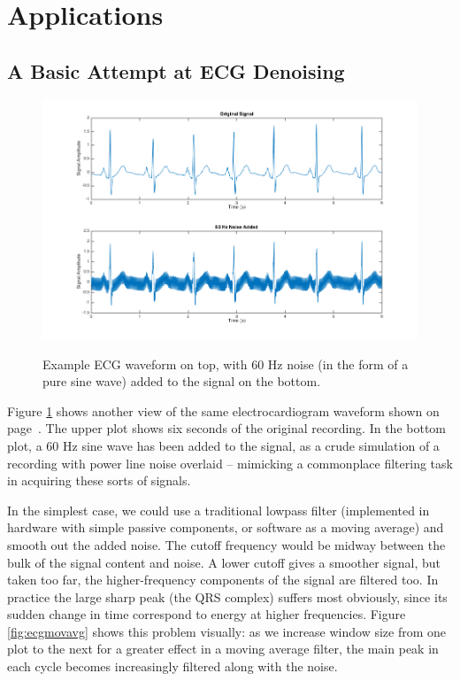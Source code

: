 \documentclass[letterpaper]{article}
\begin{document}
\section{Applications}

\subsection{A Basic Attempt at ECG Denoising}

\begin{figure}[h]
  \caption{Example ECG waveform on top, with 60 Hz noise (in the form of a pure sine wave) added to the signal on the bottom.}
  \centering
    \includegraphics[width=1\textwidth]{figures/ecgplots}
  \label{fig:ecgplots}
\end{figure}

Figure \ref{fig:ecgplots} shows another view of the same electrocardiogram waveform shown on page~\pageref{fig:ecgboth}.
The upper plot shows six seconds of the original recording.
In the bottom plot, a 60 Hz sine wave has been added to the signal,
as a crude simulation of a recording with power line noise overlaid --
mimicking a commonplace filtering task in acquiring these sorts of signals.

In the simplest case, we could use a traditional lowpass filter 
(implemented in hardware with simple passive components, or software as a moving average)
and smooth out the added noise.
The cutoff frequency would be midway between the bulk of the signal content and noise.
A lower cutoff gives a smoother signal, but taken too far, the higher-frequency components of the signal are filtered too.
In practice the large sharp peak (the QRS complex) suffers most obviously, since its sudden change in time correspond to
energy at higher frequencies.
Figure \ref{fig:ecgmovavg} shows this problem visually:
as we increase window size from one plot to the next for a greater effect in a moving average filter,
the main peak in each cycle becomes increasingly filtered along with the noise.
\end{document}

